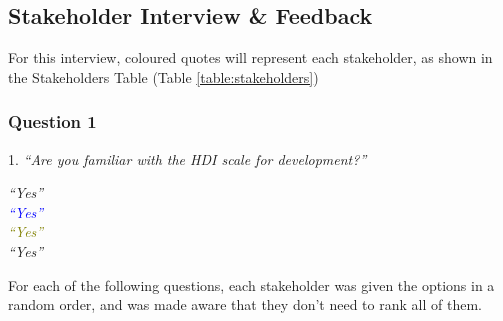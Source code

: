 \documentclass[12pt]{report}
\begin{document}
\subsection{Stakeholder Interview \& Feedback}\label{sec:stakeholderinterview}
For this interview, coloured quotes will represent each stakeholder, as shown in the Stakeholders Table (Table \ref{table:stakeholders})

\subsubsection{Question 1}
1. \textit{``Are you familiar with the HDI scale for development?''}
\begin{flushright}
\textit{\textcolor{Sepia}{``Yes''}} \\
\textit{\textcolor{Blue}{``Yes''}} \\
\textit{\textcolor{olive}{``Yes''}} \\
\textit{\textcolor{OliveGreen}{``Yes''}}
\end{flushright}
For each of the following questions, each stakeholder was given the options in a random order, and was made aware that they don't need to rank all of them.
\end{document}
